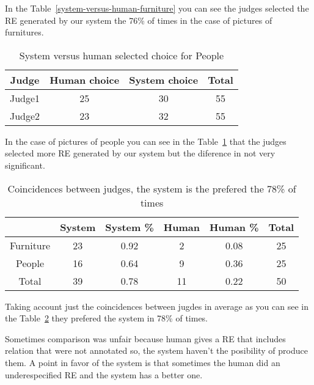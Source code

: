 In the Table~\ref{system-versus-human-furniture} you can see the judges selected the RE generated by our system the 76\% of times in the case of pictures of furnitures.

\begin{table}[h!]
\begin{center}
\begin{tabular}{|c|c|c|c|}
\hline
Judge    & Human choice & System choice & Total\\
\hline 
Judge1 & 25       & 30        & 55 \\
Judge2    & 23       & 32        & 55 \\
\hline
\end{tabular}
\caption{System versus human selected choice for People} 
\label{system-versus-human-people}
\end{center}
\end{table}

In the case of pictures of people you can see in the Table~\ref{system-versus-human-people} that the judges selected more RE generated by our system but the diference in not very significant.

\begin{table}[h!]
\begin{center}
\begin{tabular}{|c|c|c|c|c|c|}
\hline
           & System & System \% & Human & Human \% & Total\\
\hline
Furniture & 23  & 0.92 &  2 & 0.08  & 25 \\
People    & 16  & 0.64 & 9  & 0.36 & 25 \\
Total     & 39  & 0.78    & 11 & 0.22 & 50  \\
\hline
\end{tabular}
\caption{Coincidences between judges, the system is the prefered the 78\% of times} 
\label{system-better}
\end{center}
\end{table}

Taking account just the coincidences between jugdes in average as you can see in the Table~\ref{system-better} they prefered the system in 78\% of times.

Sometimes comparison was unfair because human gives a RE that includes relation that were not annotated so, the system haven't the posibility of produce them. A point in favor of the system is that sometimes the human did an underespecified RE and the system has a better one.\\


